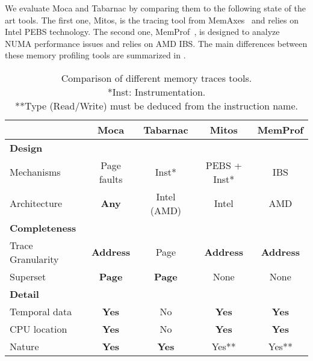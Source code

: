We evaluate \gls{Moca} and \gls{Tabarnac} by comparing them to the following state of the art tools. The first one,
\gls{Mitos}, is the tracing tool from \gls{MemAxes}~\cite{Gimenez14Dissecting} and relies on \gls{Intel} \gls{PEBS} technology.
The second one, \gls{MemProf}~\cite{Lachaize12MemProf}, is designed to analyze \gls{NUMA} performance issues and relies on \gls{AMD} \gls{IBS}.
The main differences between these memory profiling tools are summarized in .

\begin{table}[htb]
    \centering
    \begin{tabular}{lcccc}
        \toprule
         & \textbf{Moca} & \textbf{Tabarnac} & \textbf{Mitos} & \textbf{MemProf} \\
            \midrule
            \textbf{Design} & & & &\\
            \midrule
            Mechanisms   & Page faults  & Inst* & PEBS + Inst* & IBS \\
            Architecture & \textbf{Any} & Intel (AMD) & Intel & AMD   \\
            \midrule
            \textbf{Completeness} & & & &\\
            \midrule
            Trace Granularity & \textbf{Address} & Page          & \textbf{Address} & \textbf{Address} \\
            Superset          & \textbf{Page} & \textbf{Page} & None             & None             \\
            \midrule
            \textbf{Detail} & & & &\\
            \midrule
            Temporal data & \textbf{Yes} & No          & \textbf{Yes} & \textbf{Yes} \\
            CPU location  & \textbf{Yes} & No          & \textbf{Yes} & \textbf{Yes} \\
            Nature        & \textbf{Yes} &\textbf{Yes} & Yes**         & Yes**       \\
        \bottomrule
    \end{tabular}
    \caption[Comparison of different memory traces tools.]
    {Comparison of different memory traces tools.\\
        \footnotesize{
            *Inst: Instrumentation.\\
            **Type (Read/Write) must be deduced from the instruction name.
        }
    }
    \label{tab:tools-comp}
\end{table}

